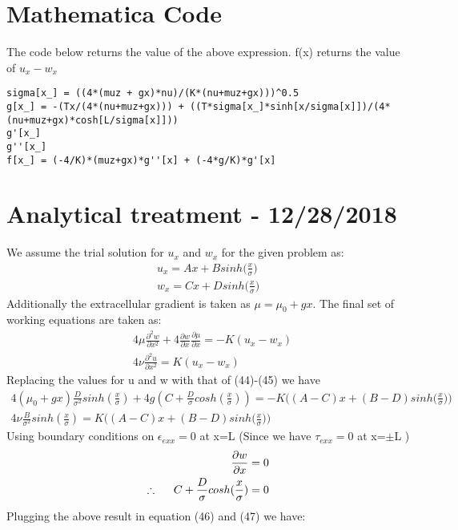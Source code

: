 \documentclass[a4paper,oneside,11pt]{report}
\begin{document}
\section*{Mathematica Code}
The code below returns the value of the above expression. f(x) returns the value of $u_x - w_x$
\begin{lstlisting}
sigma[x_] = ((4*(muz + gx)*nu)/(K*(nu+muz+gx)))^0.5
g[x_] = -(Tx/(4*(nu+muz+gx))) + ((T*sigma[x_]*sinh[x/sigma[x]])/(4*(nu+muz+gx)*cosh[L/sigma[x]]))
g'[x_]
g''[x_]
f[x_] = (-4/K)*(muz+gx)*g''[x] + (-4*g/K)*g'[x] 
\end{lstlisting}
\newpage
\section*{Analytical treatment - 12/28/2018}
We assume the trial solution for $u_x$ and $w_x$ for the given problem as: 
\begin{align}
u_x = Ax + Bsinh \Big ( \frac{x}{\sigma} \Big )\\
w_x = Cx + Dsinh \Big ( \frac{x}{\sigma} \Big )
\end{align}
Additionally the extracellular gradient is taken as $\mu = \mu_0 + gx$. The final set of working equations are taken as: 
\[\boxed{\!\begin{aligned}
	&4\mu\frac{\partial^2 w}{\partial x^2} + 4\frac{\partial w}{\partial x}\frac{\partial \mu}{\partial x} = -K(u_x - w_x) \\
	&4\nu\frac{\partial^2 u}{\partial x^2} = K(u_x - w_x)
	\end{aligned}
}
\]
Replacing the values for u and w with that of (44)-(45) we have
\begin{align}
4(\mu_0 + gx)\frac{D}{\sigma^2}sinh(\frac{x}{\sigma}) + 4g(C + \frac{D}{\sigma}cosh(\frac{x}{\sigma})) = -K \Big ( (A - C)x + (B - D)sinh\Big ( \frac{x}{\sigma} \Big )\Big )\\
4\nu\frac{B}{\sigma^2}sinh(\frac{x}{\sigma}) = K \Big ( (A - C)x + (B - D)sinh\Big ( \frac{x}{\sigma} \Big )\Big )
\end{align}
Using boundary conditions on $\epsilon_{exx} = 0$ at x=L (Since we have $\tau_{exx} = 0$ at x=$\pm$L )
\begin{align*}
\frac{\partial w}{\partial x} = 0\\
\therefore \hspace{0.5cm}
C + \frac{D}{\sigma}cosh(\frac{x}{\sigma}) = 0\\
\end{align*}
Plugging the above result in equation (46) and (47) we have: 
\end{document}
